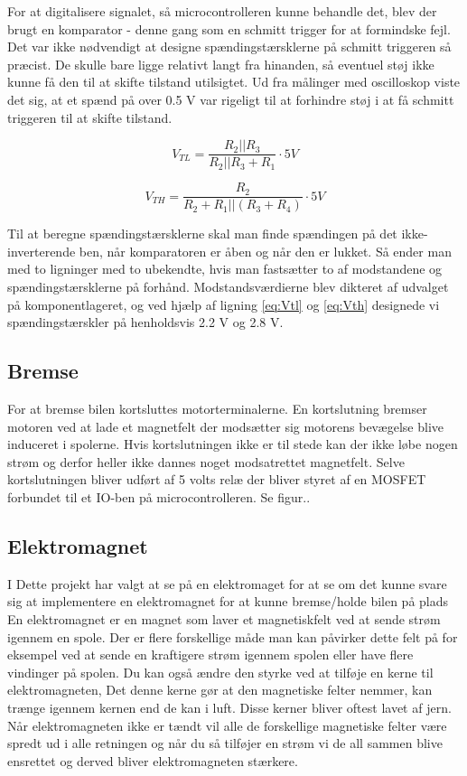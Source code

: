 For at digitalisere signalet, så microcontrolleren kunne behandle det, blev der brugt en komparator - denne gang som en schmitt trigger for at formindske fejl. Det var ikke nødvendigt at designe spændingstærsklerne på schmitt triggeren så præcist. De skulle bare ligge relativt langt fra hinanden, så eventuel støj ikke kunne få den til at skifte tilstand utilsigtet. Ud fra  målinger med oscilloskop viste det sig, at et spænd på over 0.5 V var rigeligt til at forhindre støj i at få schmitt triggeren til at skifte tilstand.

\begin{equation}
V_{TL} = \dfrac{R_{2}||R_{3}}{R_{2}||R_{3}+R_{1}} \cdot 5V
\label{eq:Vtl}
\end{equation}


\begin{equation}
V_{TH} = \dfrac{R_{2}}{R_{2}+R_{1}||(R_{3}+R_{4})} \cdot 5V
\label{eq:Vth}
\end{equation}



Til at beregne spændingstærsklerne skal man finde spændingen på det ikke-inverterende ben, når komparatoren er åben og når den er lukket. Så ender man med to ligninger med to ubekendte, hvis man fastsætter to af modstandene og spændingstærsklerne på forhånd. Modstandsværdierne blev dikteret af udvalget på komponentlageret, og ved hjælp af ligning \eqref{eq:Vtl} og \eqref{eq:Vth} designede vi spændingstærskler på henholdsvis 2.2 V og 2.8 V. 

\subsection{Bremse}

For at bremse bilen kortsluttes motorterminalerne. En kortslutning bremser motoren ved at lade et magnetfelt der modsætter sig motorens bevægelse blive induceret i spolerne. Hvis kortslutningen ikke er til stede kan der ikke løbe nogen strøm og derfor heller ikke dannes noget modsatrettet magnetfelt. Selve kortslutningen bliver udført af 5 volts relæ der bliver styret af en MOSFET forbundet til et IO-ben på microcontrolleren. Se figur.. 

\subsection{Elektromagnet}
I Dette projekt har valgt at se på en elektromaget for at se om det kunne svare sig at implementere en elektromagnet for at kunne bremse/holde bilen på plads
En elektromagnet er en magnet som laver et magnetiskfelt ved at sende strøm igennem en spole. Der er flere forskellige måde man kan påvirker dette felt på for eksempel ved at sende en kraftigere strøm igennem spolen eller have flere vindinger på spolen. Du kan også ændre den styrke ved at tilføje en kerne til elektromagneten, Det denne kerne gør at den magnetiske felter nemmer, kan trænge igennem kernen end de kan i luft. Disse kerner bliver oftest lavet af jern.
Når elektromagneten ikke er tændt vil alle de forskellige magnetiske felter være spredt ud i alle retningen og når du så tilføjer en strøm vi de all sammen blive ensrettet og derved bliver elektromagneten stærkere.

